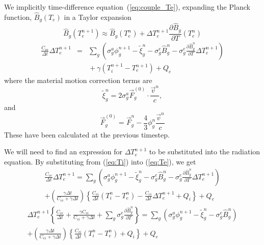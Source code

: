 \documentclass{article}
\newcommand{\partl}[2]{\ensuremath{\frac{\partial{#1}}{\partial{#2}}}}\newcommand{\del}{\ensuremath{\vec{\nabla}}}
\newcommand{\dt}{\ensuremath{\Delta t}}
\newcommand{\cviOdt}{\ensuremath{\frac{C_{vi}}{\dt}}}
\newcommand{\cveOdt}{\ensuremath{\frac{C_{ve}}{\dt}}}
\newcommand{\Bg}{\ensuremath{\hat{B}_{g}}}
\newcommand{\Bgn}{\ensuremath{\hat{B}_{g}^{n}}}
\newcommand{\pBgndT}{\ensuremath{\frac{\partial\Bgn}{\partial T}}}
\begin{document}
We implicitly time-difference equation~(\ref{eq:couple_Te}),
expanding the Planck function,
$\Bg(T_{e})$ in a Taylor expansion
\begin{equation}
	\Bg(T_{e}^{n+1}) \approx \Bg(T_{e}^{n})
		 + \Delta T_{e}^{n+1} \partl{\Bg}{T}(T_{e}^{n})
\end{equation}
\begin{eqnarray}
	\cveOdt \Delta T_{e}^{n+1} &=&
		\sum_{g} \left(
			\sigma_{g}^{a} \phi_{g}^{n+1} - \tilde{\xi}_{g}^{n}
			- \sigma_{g}^{e} \Bgn
			- \sigma_{g}^{e} \pBgndT \Delta T_{e}^{n+1} 
			\right) \nonumber \\
		& & \mbox{} + \gamma (T_{i}^{n+1} - T_{e}^{n+1}) + Q_{e}
\label{eq:Te}
\end{eqnarray}
where the material motion correction terms are
\begin{equation}
	\tilde{\xi}_{g}^{n} = 2 \sigma_{g}^{a} \vec{F}_{g}^{(0)} \cdot
				\frac{\vec{v}^{n}}{c}, 
\label{eq:tilde_xi}
\end{equation}
and
\begin{equation}
	\vec{F}_{g}^{(0)} = \vec{F}_{g}^{n} - \frac{4}{3} \phi_{g}^{n}
						\frac{\vec{v}^{n}}{c}
\end{equation}
These have been calculated at the previous timestep.

We will need to find an expression for $\Delta T_{e}^{n+1}$ to be
substituted into the radiation equation.
By substituting from (\ref{eq:Ti}) into (\ref{eq:Te}), we get
\begin{multline}
	\cveOdt \Delta T_{e}^{n+1} =
		\sum_{g} \left(
			\sigma_{g}^{a} \phi_{g}^{n+1} - \tilde{\xi}_{g}^{n}
			- \sigma_{g}^{e} \Bgn
			- \sigma_{g}^{e} \pBgndT \Delta T_{e}^{n+1} 
			\right)
	\\
			 + \left(\frac{\gamma\dt}{C_{vi} + 
					\gamma \dt} \right)
			\left\{\cviOdt(T_{i}^{n}-T_{e}^{n})
				 - \cviOdt \Delta T_{e}^{n+1}
			+ Q_{i} \right\}
			+ Q_{e}
\end{multline}
\begin{multline}
	\Delta T_{e}^{n+1} \left\{ \cveOdt +
		\frac{\gamma C_{vi}}{C_{vi} + \gamma \dt } +
		\sum_{g} \sigma_{g}^{e} \pBgndT \right\} =
		   \sum_{g} \left( \sigma_{g}^{a} \phi_{g}^{n+1} - 
			\tilde{\xi}_{g}^{n} - \sigma_{g}^{e} \Bgn \right)
	\\
		  +  \left(\frac{\gamma\dt}{C_{vi} + 
					\gamma \dt} \right)
			\left\{\cviOdt(T_{i}^{n}-T_{e}^{n}) + Q_{i} \right\}
			 + Q_{e}
\end{multline}
\end{document}

